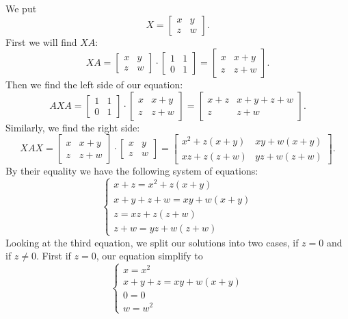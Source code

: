 \documentclass{article}
\begin{document}
\begin{solution}
  We put
  \[X = \begin{bmatrix} x & y\\ z & w \end{bmatrix}.\]
  First we will find $X A$:
  \[X A =  \begin{bmatrix} x & y\\ z & w \end{bmatrix} \cdot  \begin{bmatrix} 1 & 1\\ 0 & 1 \end{bmatrix} =  \begin{bmatrix} x & x + y\\ z & z + w \end{bmatrix}.\]
  Then we find the left side of our equation:
  \[A X A =  \begin{bmatrix} 1 & 1\\ 0 & 1 \end{bmatrix} \cdot \begin{bmatrix} x & x + y\\ z & z + w \end{bmatrix} = \begin{bmatrix} x + z & x + y + z + w\\ z & z + w \end{bmatrix}.\]
  Similarly, we find the right side:
  \[X A X = \begin{bmatrix} x & x + y\\ z & z + w \end{bmatrix} \cdot \begin{bmatrix} x & y\\ z & w \end{bmatrix} = \begin{bmatrix} x^2 + z (x + y) & x y + w (x + y)\\ xz + z (z + w) & yz + w (z + w) \end{bmatrix}.\]
  By their equality we have the following system of equations:
  \[\begin{cases} x + z = x^2 + z(x + y)\\ x + y + z + w = xy + w(x + y)\\ z = xz + z(z + w)\\ z + w = yz + w(z + w) \end{cases}\]
  Looking at the third equation, we split our solutions into two cases, if $z = 0$ and if $z \neq 0$.
  First if $z = 0$, our equation simplify to
  \[\begin{cases} x = x^2\\x + y + z = xy + w(x + y)\\ 0 = 0\\ w = w^2 \end{cases}\]

\end{solution}
\end{document}

